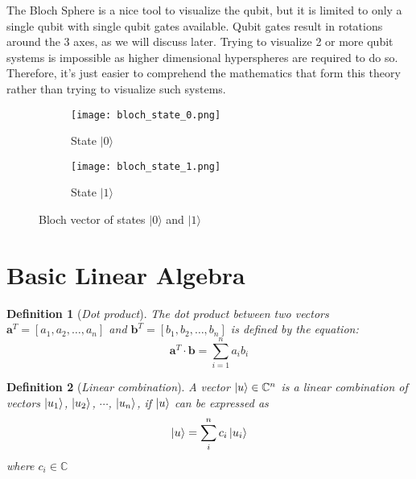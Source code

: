 \documentclass[12pt,a4paper]{report}
\newtheorem{definition}{Definition}
\begin{document}
\noindent
The Bloch Sphere is a nice tool to visualize the qubit, but it is limited to only a single qubit with single qubit gates available. Qubit gates result in rotations around the 3 axes, as we will discuss later. Trying to visualize 2 or more qubit systems is impossible as higher dimensional hyperspheres are required to do so. Therefore, it's just easier to comprehend the mathematics that form this theory rather than trying to visualize such systems.

\begin{figure}[H]
    \centering
    \begin{subfigure}{0.45\textwidth}
        \texttt{[image: bloch\_state\_0.png]}
        \caption{State \(|0\rangle\)}
        \label{fig:state_0_bloch_sphere}
    \end{subfigure}
    \begin{subfigure}{0.45\textwidth}
        \texttt{[image: bloch\_state\_1.png]}
        \caption{State \(|1\rangle\)}
        \label{fig:state_1_bloch_sphere}
    \end{subfigure}
    \caption{Bloch vector of states \(|0\rangle\) and \(|1\rangle\)}
    \label{fig:basis_state_bloch_sphere}
\end{figure}

\newpage

\section{Basic Linear Algebra}

\begin{definition}[\emph{Dot product}]
The dot product between two vectors 
\( \mathbf{a}^T = [a_1, a_2, \dots, a_n] \) 
and 
\( \mathbf{b}^T = [b_1, b_2, \dots, b_n] \)
is defined by the equation:
\begin{equation}
\mathbf{a}^T \cdot \mathbf{b} = \sum_{i=1}^{n} a_i b_i
\end{equation}
\end{definition}

\begin{definition}[\emph{Linear combination}]
A vector $\ket{u} \in \mathbb{C}^n$ is a linear combination of vectors $\ket{u_1}$, $\ket{u_2}$, $\cdots$, $\ket{u_n}$, if $\ket{u}$ can be expressed as 
\begin{equation}
    \ket{u} = \sum_i^n c_i \ket{u_i}
\end{equation}
where $c_i \in \mathbb{C}$
\end{definition}
\end{document}
